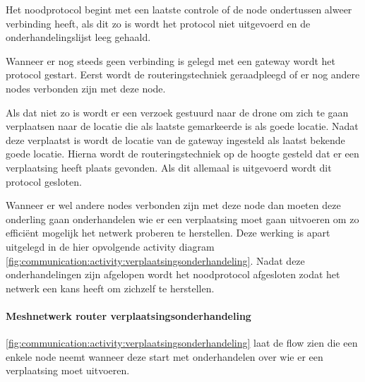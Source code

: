 \documentclass[a4paper, 11pt, oneside]{report}
\begin{document}
Het noodprotocol begint met een laatste controle of de node ondertussen alweer verbinding heeft, als dit zo is wordt het protocol niet uitgevoerd en de onderhandelingslijst leeg gehaald.

Wanneer er nog steeds geen verbinding is gelegd met een gateway wordt het protocol gestart.
Eerst wordt de routeringstechniek geraadpleegd of er nog andere nodes verbonden zijn met deze node.

Als dat niet zo is wordt er een verzoek gestuurd naar de drone om zich te gaan verplaatsen naar de locatie die als laatste gemarkeerde is als goede locatie.
Nadat deze verplaatst is wordt de locatie van de gateway ingesteld als laatst bekende goede locatie.
Hierna wordt de routeringstechniek op de hoogte gesteld dat er een verplaatsing heeft plaats gevonden.
Als dit allemaal is uitgevoerd wordt dit protocol gesloten.

Wanneer er wel andere nodes verbonden zijn met deze node dan moeten deze onderling gaan onderhandelen wie er een verplaatsing moet gaan uitvoeren om zo efficiënt mogelijk het netwerk proberen te herstellen. Deze werking is apart uitgelegd in de hier opvolgende activity diagram \ref{fig:communication:activity:verplaatsingsonderhandeling}. Nadat deze onderhandelingen zijn afgelopen wordt het noodprotocol afgesloten zodat het netwerk een kans heeft om zichzelf te herstellen.
\pagebreak
\paragraph{Meshnetwerk router verplaatsingsonderhandeling}
\autoref{fig:communication:activity:verplaatsingsonderhandeling} laat de flow zien die een enkele node neemt wanneer deze start met onderhandelen over wie er een verplaatsing moet uitvoeren.
\end{document}
